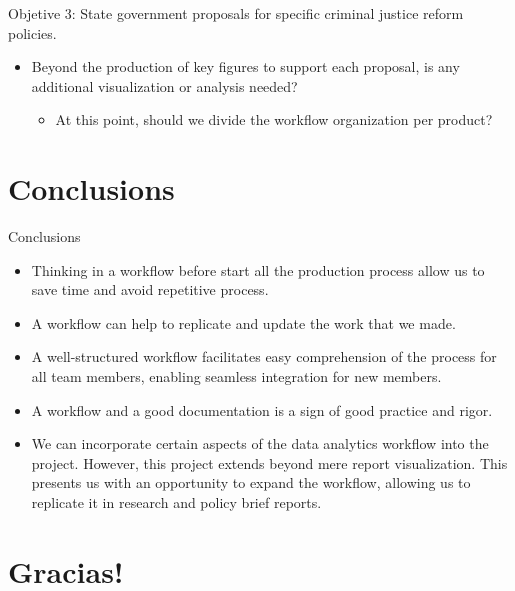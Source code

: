 \documentclass[
  ignorenonframetext,
]{beamer}
\providecommand{\tightlist}{%
  \setlength{\itemsep}{0pt}\setlength{\parskip}{0pt}}\usepackage{longtable,booktabs,array}
\begin{document}
\begin{frame}{Objetive 3: State government proposals for specific
criminal justice reform policies.}
\protect\hypertarget{objetive-3-state-government-proposals-for-specific-criminal-justice-reform-policies.}{}
\begin{itemize}
\item
  Beyond the production of key figures to support each proposal, is any
  additional visualization or analysis needed?

  \begin{itemize}
  \tightlist
  \item
    At this point, should we divide the workflow organization per
    product?
  \end{itemize}
\end{itemize}
\end{frame}

\hypertarget{conclusions}{%
\section{Conclusions}\label{conclusions}}

\begin{frame}{Conclusions}
\protect\hypertarget{conclusions-1}{}
\begin{itemize}
\item
  Thinking in a workflow before start all the production process allow
  us to save time and avoid repetitive process.
\item
  A workflow can help to replicate and update the work that we made.
\item
  A well-structured workflow facilitates easy comprehension of the
  process for all team members, enabling seamless integration for new
  members.
\item
  A workflow and a good documentation is a sign of good practice and
  rigor.
\item
  We can incorporate certain aspects of the data analytics workflow into
  the project. However, this project extends beyond mere report
  visualization. This presents us with an opportunity to expand the
  workflow, allowing us to replicate it in research and policy brief
  reports.
\end{itemize}
\end{frame}

\hypertarget{gracias}{%
\section{Gracias!}\label{gracias}}
\end{document}
